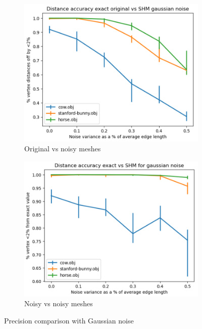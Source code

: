 \documentclass[sigconf]{acmart}
\begin{document}
\begin{figure}[htbp]
  \centering
  \hfill
  \begin{subfigure}[b]{0.23\textwidth}
    \centering
    \includegraphics[width=\textwidth]{original_vs_noisy.png}
    \caption{Original vs noisy meshes}
    \label{fig:original_vs_noisy}
  \end{subfigure}
  \begin{subfigure}[b]{0.23\textwidth}
    \centering
    \includegraphics[width=\textwidth]{noisy_vs_noisy.png}
    \caption{Noisy vs noisy meshes}
    \label{fig:noisy_vs_noisy}
  \end{subfigure}
  \caption{Precision comparison with Gaussian noise}
  \label{fig:original_vs_noisy_gaussian}
\end{figure}
\end{document}
